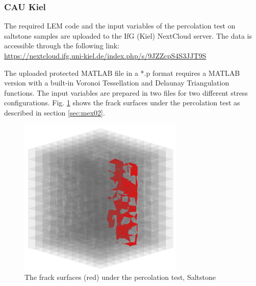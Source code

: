 \subsubsection*{CAU Kiel}

The required LEM code and the input variables of the percolation test on saltstone samples are uploaded to the IfG (Kiel) NextCloud server. The data is accessible through the following link:\\
\url{https://nextcloud.ifg.uni-kiel.de/index.php/s/9JZZcpS4S3JJT9S}

The uploaded protected MATLAB file in a *.p format requires a MATLAB version with a built-in Voronoi Tessellation and Delaunay Triangulation functions. The input variables are prepared in two files for two different stress configurations. Fig. \ref{fig:Amir_ME2_LEM_b_model_Fracture_Data} shows the frack surfaces under the percolation test as described in section \ref {sec:mex02}.

\begin{figure}[!ht]
\centering
\includegraphics[width=0.7\textwidth]{figures/Amir_ME2_LEM_b_model_Fracture_Data.png}
\caption{The frack surfaces (red) under the percolation test, Saltstone}
\label{fig:Amir_ME2_LEM_b_model_Fracture_Data}
\end{figure}

